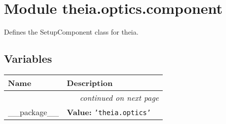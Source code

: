 %
%
%


\section{Module theia.optics.component}

    \label{theia:optics:component}
Defines the SetupComponent class for theia.



  \subsection{Variables}

    \vspace{-1cm}
\hspace{\varindent}\begin{longtable}{|p{\varnamewidth}|p{\vardescrwidth}|l}
\cline{1-2}
\cline{1-2} \centering \textbf{Name} & \centering \textbf{Description}& \\
\cline{1-2}
\endhead\cline{1-2}\multicolumn{3}{r}{\small\textit{continued on next page}}\\\endfoot\cline{1-2}
\endlastfoot\raggedright \_\-\_\-p\-a\-c\-k\-a\-g\-e\-\_\-\_\- & \raggedright \textbf{Value:} 
{\tt \texttt{'}\texttt{theia.optics}\texttt{'}}&\\
\cline{1-2}
\end{longtable}



